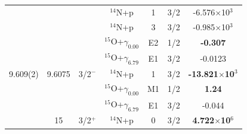 \begin{table}[]
\begin{center}
\begin{threeparttable}
\begin{tabular}{c  c  c  c  c  c  c}
	&	&	&	$^{14}$N+p	&	1	&	3/2	&	{-6.576$\times$10$^3$}\\
	&	&	&	$^{14}$N+p	&	3	&	3/2	&	{-0.985$\times$10$^3$}\\
	&	&	&	$^{15}$O+$\gamma_{0.00}$	&	E2	&	1/2	&	\textbf{-0.307}\\
	&	&	&	$^{15}$O+$\gamma_{6.79}$	&	E1	&	3/2	&	{-0.0123}\\
9.609(2) & {9.6075}&	3/2$^-$	&	$^{14}$N+p	&	1	&	3/2	&	\textbf{-13.821$\times$10$^3$}\\
	&	&	&	$^{15}$O+$\gamma_{0.00}$	&	M1	&	1/2	&	\textbf{1.24}\\
     &	&	&	$^{15}$O+$\gamma_{6.79}$	&	E1	&	3/2	&	{-0.044}\\
& {15}	&	3/2$^+$	&	$^{14}$N+p	&	0	&	3/2	&	\textbf{4.722$\times$10$^6$}\\

\end{tabular}
\end{threeparttable}
\end{center}
\end{table}
